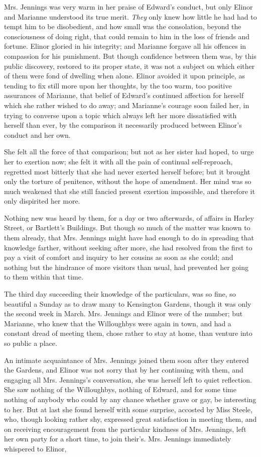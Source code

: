 Mrs. Jennings was very warm in her praise of Edward's conduct, but only Elinor and Marianne understood its true merit. {\em They} only knew how little he had had to tempt him to be disobedient, and how small was the consolation, beyond the consciousness of doing right, that could remain to him in the loss of friends and fortune. Elinor gloried in his integrity; and Marianne forgave all his offences in compassion for his punishment. But though confidence between them was, by this public discovery, restored to its proper state, it was not a subject on which either of them were fond of dwelling when alone. Elinor avoided it upon principle, as tending to fix still more upon her thoughts, by the too warm, too positive assurances of Marianne, that belief of Edward's continued affection for herself which she rather wished to do away; and Marianne's courage soon failed her, in trying to converse upon a topic which always left her more dissatisfied with herself than ever, by the comparison it necessarily produced between Elinor's conduct and her own.

She felt all the force of that comparison; but not as her sister had hoped, to urge her to exertion now; she felt it with all the pain of continual self-reproach, regretted most bitterly that she had never exerted herself before; but it brought only the torture of penitence, without the hope of amendment. Her mind was so much weakened that she still fancied present exertion impossible, and therefore it only dispirited her more.

Nothing new was heard by them, for a day or two afterwards, of affairs in Harley Street, or Bartlett's Buildings. But though so much of the matter was known to them already, that Mrs. Jennings might have had enough to do in spreading that knowledge farther, without seeking after more, she had resolved from the first to pay a visit of comfort and inquiry to her cousins as soon as she could; and nothing but the hindrance of more visitors than usual, had prevented her going to them within that time.

The third day succeeding their knowledge of the particulars, was so fine, so beautiful a Sunday as to draw many to Kensington Gardens, though it was only the second week in March. Mrs. Jennings and Elinor were of the number; but Marianne, who knew that the Willoughbys were again in town, and had a constant dread of meeting them, chose rather to stay at home, than venture into so public a place.

An intimate acquaintance of Mrs. Jennings joined them soon after they entered the Gardens, and Elinor was not sorry that by her continuing with them, and engaging all Mrs. Jennings's conversation, she was herself left to quiet reflection. She saw nothing of the Willoughbys, nothing of Edward, and for some time nothing of anybody who could by any chance whether grave or gay, be interesting to her. But at last she found herself with some surprise, accosted by Miss Steele, who, though looking rather shy, expressed great satisfaction in meeting them, and on receiving encouragement from the particular kindness of Mrs. Jennings, left her own party for a short time, to join their's. Mrs. Jennings immediately whispered to Elinor,

